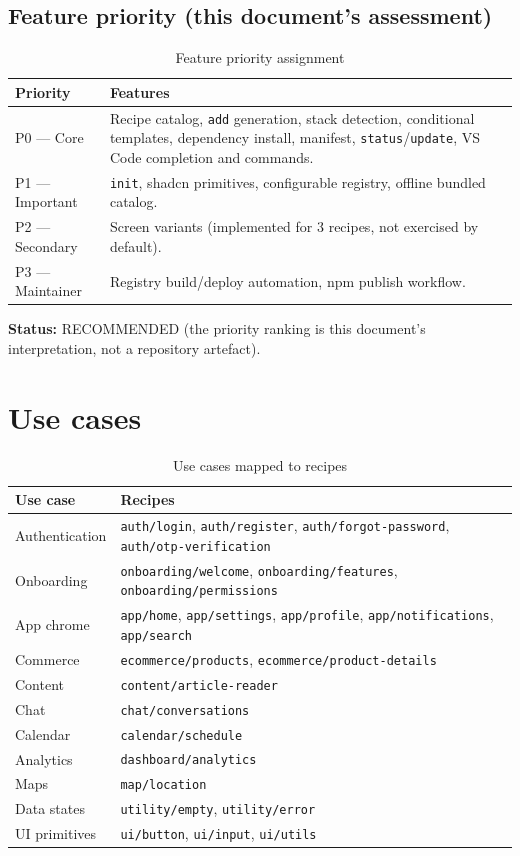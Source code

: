 \subsection*{Feature priority (this document's assessment)}
\begin{table}[H]
\centering
\caption{Feature priority assignment}
\begin{tabular}{p{2.2cm}p{11.6cm}}
\toprule
\textbf{Priority} & \textbf{Features} \\
\midrule
P0 --- Core & Recipe catalog, \texttt{add} generation, stack detection, conditional templates, dependency install, manifest, \texttt{status}/\texttt{update}, VS Code completion and commands. \\
P1 --- Important & \texttt{init}, shadcn primitives, configurable registry, offline bundled catalog. \\
P2 --- Secondary & Screen variants (implemented for 3 recipes, not exercised by default). \\
P3 --- Maintainer & Registry build/deploy automation, npm publish workflow. \\
\bottomrule
\end{tabular}
\end{table}

\textbf{Status:} RECOMMENDED (the priority ranking is this document's
interpretation, not a repository artefact).

\section{Use cases}

\begin{longtable}{p{4.4cm}p{10cm}}
\caption{Use cases mapped to recipes}\\
\toprule
\textbf{Use case} & \textbf{Recipes} \\
\midrule

Authentication & \texttt{auth/login}, \texttt{auth/register}, \texttt{auth/forgot-password}, \texttt{auth/otp-verification} \\
Onboarding & \texttt{onboarding/welcome}, \texttt{onboarding/features}, \texttt{onboarding/permissions} \\
App chrome & \texttt{app/home}, \texttt{app/settings}, \texttt{app/profile}, \texttt{app/notifications}, \texttt{app/search} \\
Commerce & \texttt{ecommerce/products}, \texttt{ecommerce/product-details} \\
Content & \texttt{content/article-reader} \\
Chat & \texttt{chat/conversations} \\
Calendar & \texttt{calendar/schedule} \\
Analytics & \texttt{dashboard/analytics} \\
Maps & \texttt{map/location} \\
Data states & \texttt{utility/empty}, \texttt{utility/error} \\
UI primitives & \texttt{ui/button}, \texttt{ui/input}, \texttt{ui/utils} \\
\bottomrule
\end{longtable}

